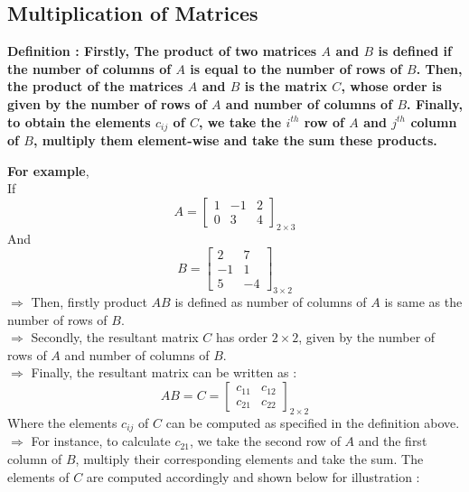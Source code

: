 \documentclass[12pt, letterpaper]{article}
\begin{document}
\subsection{Multiplication of Matrices}
\begin{displayquote}
\textbf{Definition : Firstly, The product of two matrices $A$ and $B$ is defined if the number of columns of $A$ is equal to the number of rows of $B$. Then, the product of the matrices $A$ and $B$ is the matrix $C$, whose order is given by the number of rows of $A$ and number of columns of $B$. Finally, to obtain the elements $c_{ij}$ of $C$, we take the $i^{th}$ row of $A$ and $j^{th}$ column of $B$, multiply them element-wise and take the sum these products.}  
\end{displayquote}
\textbf{For example},\\
If
\begin{displaymath}
 A = \begin{bmatrix}
1 & -1 & 2\\
0 & 3 & 4
\end{bmatrix}_{2 \times 3}
\end{displaymath} 
And 
\begin{displaymath}
B = \begin{bmatrix}
2 & 7\\
-1 & 1\\
5 & -4
\end{bmatrix}_{3 \times 2}
\end{displaymath}
$\Rightarrow$ Then, firstly product $AB$ is defined as number of columns of $A$ is same as the number of rows of $B$.\\
$\Rightarrow$ Secondly, the resultant matrix $C$ has order $2 \times 2$, given by the number of rows of $A$ and number of columns of $B$.\\
$\Rightarrow$ Finally, the resultant matrix can be written as : 
\begin{displaymath}
AB = C = \begin{bmatrix}
c_{11} & c_{12}\\
c_{21} & c_{22}
\end{bmatrix}_{2 \times 2}
\end{displaymath}
Where the elements $c_{ij}$ of $C$ can be computed as specified in the definition above.\\
$\Rightarrow$ For instance, to calculate $c_{21}$, we take the second row of $A$ and the first column of $B$, multiply their corresponding elements and take the sum. The elements of $C$ are computed accordingly and shown below for illustration :  
\end{document}
